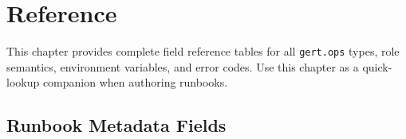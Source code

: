 \chapter{Reference}
\label{ch:reference}

This chapter provides complete field reference tables for all \texttt{gert.ops} types,
role semantics, environment variables, and error codes. Use this chapter as a quick-lookup
companion when authoring runbooks.

\section{Runbook Metadata Fields}
\label{sec:ref-metadata}

